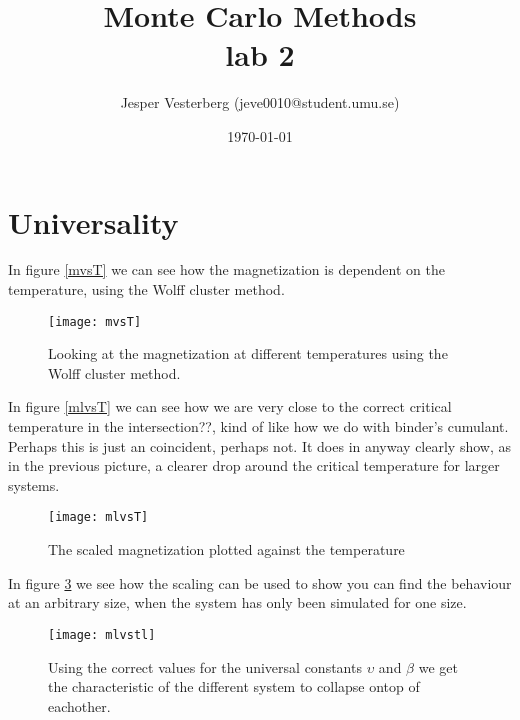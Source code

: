 \documentclass[11pt]{article}
\title{Monte Carlo Methods \\ lab 2}
\author{Jesper Vesterberg (jeve0010@student.umu.se)}
\date{\today}
\begin{document}
\begin{titlepage}
  \maketitle
  \thispagestyle{fancy}
  \rhead{\today}
  \begin{abstract}

  \end{abstract}
\end{titlepage}

\lhead{\theauthor}
\rhead{\thetitle\\\today}
\cfoot{\thepage}



\begin{thebibliography}{9}
\end{thebibliography}

\section{Universality}
In figure \ref{mvsT} we can see how the magnetization is dependent on the temperature, using
the Wolff cluster method.
\begin{figure}[H]
	\centering
	\texttt{[image: mvsT]}
	\caption{Looking at the magnetization at different temperatures using the Wolff cluster
method.}
	\label{fig:mvsT}
\end{figure}

\newpage
In figure \ref{mlvsT} we can see how we are very close to the correct critical temperature in the
intersection??, kind of like how we do with binder’s cumulant. Perhaps this is just an
coincident, perhaps not. It does in anyway clearly show, as in the previous picture, a
clearer drop around the critical temperature for larger systems.
\begin{figure}[H]
	\centering
	\texttt{[image: mlvsT]}
	\caption{The scaled magnetization plotted against the temperature}
	\label{fig:mlvsT}
\end{figure}

\newpage
In figure \ref{fig:mlvstl} we see how the scaling can be used to show you can find the behaviour at
an arbitrary size, when the system has only been simulated for one size.
\begin{figure}[H]
	\centering
	\texttt{[image: mlvstl]}
	\caption{Using the correct values for the universal constants $\upsilon$ and $\beta$ we get the
characteristic of the different system to collapse ontop of eachother.}
	\label{fig:mlvstl}
\end{figure}
\end{document}
